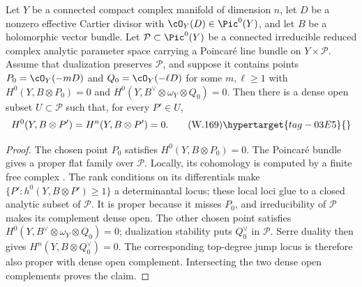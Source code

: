 \begin{lemma}
\hypertarget{tag-03IA}{}\label{wbII:lem:generic-endpoints}

Let $Y$ be a connected compact complex manifold of dimension $n$, let $D$ be
a nonzero effective Cartier divisor with $\cO_Y(D)\in\Pic^0(Y)$, and let
$B$ be a holomorphic vector bundle.  Let $\mathcal P\subset\Pic^0(Y)$ be a
connected irreducible reduced complex analytic parameter space carrying a
Poincar\'e line bundle on $Y\times\mathcal P$.  Assume that dualization
preserves $\mathcal P$, and suppose it
  contains points $P_0=\cO_Y(-mD)$ and $Q_0=\cO_Y(-\ell D)$ for some
  $m,\ell\ge1$ with
  $H^0(Y,B\otimes P_0)=0$ and
  $H^0(Y,B^\vee\otimes\omega_Y\otimes Q_0)=0$.  Then there is a dense open subset
$U\subset\mathcal P$ such that, for every $P'\in U$,
\[
 H^0(Y,B\otimes P')=H^n(Y,B\otimes P')=0.
 \tag{W.169}\hypertarget{tag-03E5}{}\label{wbII:eq:CN:5.2}
\]
\end{lemma}



\begin{proof}
  The chosen point $P_0$ satisfies
  $H^0(Y,B\otimes P_0)=0$.  The Poincar\'e bundle gives a proper flat family over
$\mathcal P$.  Locally, its cohomology is computed by a finite free complex
\cite[Chapter~III, \S4, Theorem~4.1, p.~124]{BS76push}.
The rank conditions on its differentials make
$\{P':h^0(Y,B\otimes P')\ge1\}$ a determinantal locus; these local loci glue
to a closed analytic subset of $\mathcal P$.  It is proper because it misses $P_0$, and irreducibility of
$\mathcal P$ makes its complement dense open.  The other chosen point satisfies
$H^0(Y,B^\vee\otimes\omega_Y\otimes Q_0)=0$; dualization stability puts
$Q_0^\vee$ in $\mathcal P$.  Serre duality then gives
$H^n(Y,B\otimes Q_0^\vee)=0$.  The corresponding top-degree jump locus is
therefore also proper with dense open complement.  Intersecting the two
dense open complements proves the claim.

\end{proof}